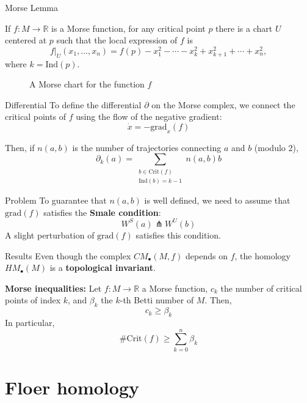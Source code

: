 \documentclass{beamer}
\newcommand{\con}[1]{\mathbb{#1}}
\newcommand{\R}{\con{R}}
\begin{document}
\begin{frame}{Morse Lemma}
	\begin{theorem}
		If $f : M \rightarrow \R$ is a Morse function, for any critical point $p$ there is a chart $U$ centered at $p$ such that the local expression of $f$ is
		\[\left. f\right|_U(x_1,...,x_n) = f(p) - x_1^2 - \cdots - x_k^2 + x_{k+1}^2 + \cdots + x_n^2,\]
		where $k = \mathrm{Ind}(p)$.
	\end{theorem}

	\begin{figure}
		
		\label{figure:morse_chart}
		\caption{A Morse chart for the function $f$}
	\end{figure}
\end{frame}

\begin{frame}{Differential}
	To define the differential $\partial$ on the Morse complex, we connect the critical points of $f$ using the flow of the negative gradient:
	\[\dot{x} = - \mathrm{grad}_x (f)\]

	Then, if $n(a,b)$ is the number of trajectories connecting $a$ and $b$ (modulo 2),
	\[\partial_k(a) = \sum_{\substack{b \in \mathrm{Crit}(f) \\ \mathrm{Ind}(b) = k-1}} n(a,b) b\]

	\begin{block}{Problem}
		To guarantee that $n(a,b)$ is well defined, we need to assume that $\mathrm{grad}(f)$ satisfies the {\bf Smale condition}:
		\[W^S(a) \pitchfork W^U(b)\]
		A slight perturbation of $\mathrm{grad}(f)$ satisfies this condition.
	\end{block}
\end{frame}

\begin{frame}{Results}
	Even though the complex $CM_{\bullet}(M,f)$ depends on $f$, the homology $HM_{\bullet}(M)$ is a {\bf topological invariant}.

	\begin{theorem}
		{\bf Morse inequalities:} Let $f : M \rightarrow \R$ a Morse function, $c_k$ the number of critical points of index $k$, and $\beta_k$ the $k$-th Betti number of $M$. Then,
		\[c_k \geq \beta_k\]
		In particular,
		\[\# \mathrm{Crit}(f) \geq \sum_{k=0}^n \beta_k\]
	\end{theorem}
\end{frame}

\section{Floer homology}
\end{document}
